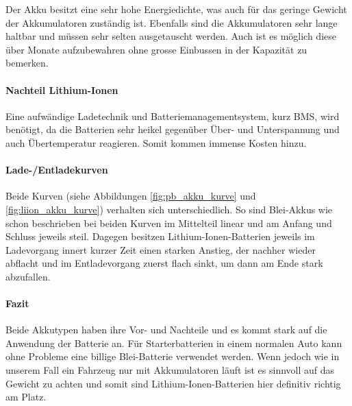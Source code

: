 Der Akku besitzt eine sehr hohe Energiedichte, was auch für das geringe Gewicht der Akkumulatoren zuständig ist. Ebenfalls sind die Akkumulatoren sehr lange haltbar und müssen sehr selten ausgetauscht werden. Auch ist es möglich diese über Monate aufzubewahren ohne grosse Einbussen in der Kapazität zu bemerken.

\paragraph{Nachteil Lithium-Ionen}

Eine aufwändige Ladetechnik und Batteriemanagementsystem, kurz BMS, wird benötigt, da die Batterien sehr heikel gegenüber Über- und Unterspannung und auch Übertemperatur reagieren. Somit kommen immense Kosten hinzu.

\paragraph{Lade-/Entladekurven}

Beide Kurven (siehe Abbildungen \ref{fig:pb_akku_kurve} und \ref{fig:liion_akku_kurve}) verhalten sich unterschiedlich. So sind Blei-Akkus wie schon beschrieben bei beiden Kurven im Mittelteil linear und am Anfang und Schluss jeweils steil. Dagegen besitzen Lithium-Ionen-Batterien jeweils im Ladevorgang innert kurzer Zeit einen starken Anstieg, der nachher wieder abflacht und im Entladevorgang zuerst flach sinkt, um dann am Ende stark abzufallen.

\paragraph{Fazit}

Beide Akkutypen haben ihre Vor- und Nachteile und es kommt stark auf die Anwendung der Batterie an. Für Starterbatterien in einem normalen Auto kann ohne Probleme eine billige Blei-Batterie verwendet werden. Wenn jedoch wie in unserem Fall ein Fahrzeug nur mit Akkumulatoren läuft ist es sinnvoll auf das Gewicht zu achten und somit sind Lithium-Ionen-Batterien hier definitiv richtig am Platz.